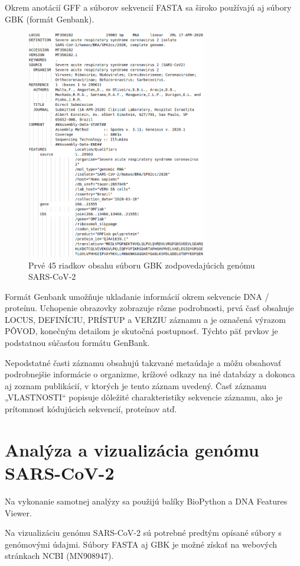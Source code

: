Okrem anotácií GFF a súborov sekvencií FASTA sa široko používajú aj súbory GBK (formát Genbank).
\begin{figure}[!ht]
	\centering
	\includegraphics[width=0.7\textwidth]{figures/gbk.png}
	\caption{Prvé 45 riadkov obsahu súboru GBK zodpovedajúcich genómu SARS-CoV-2\label{o:latex_friendly_zone}}
\end{figure}
Formát Genbank umožňuje ukladanie informácií okrem sekvencie DNA / proteínu.
Uchopenie obrazovky zobrazuje rôzne podrobnosti, prvá časť obsahuje LOCUS, DEFINÍCIU, PRÍSTUP a VERZIU záznamu a je označená výrazom PÔVOD, konečným detailom je skutočná postupnosť.
Týchto päť prvkov je podstatnou súčasťou formátu GenBank.

Nepodstatné časti záznamu obsahujú takzvané metaúdaje a môžu obsahovať podrobnejšie informácie o organizme, krížové odkazy na iné databázy a dokonca aj zoznam publikácií, v ktorých je tento záznam uvedený.
Časť záznamu „VLASTNOSTI“ popisuje dôležité charakteristiky sekvencie záznamu, ako je prítomnosť kódujúcich sekvencií, proteínov atď.

\section{Analýza a vizualizácia genómu SARS-CoV-2}
Na vykonanie samotnej analýzy sa použijú balíky BioPython a DNA Features Viewer.

Na vizualizáciu genómu SARS-CoV-2 sú potrebné predtým opísané súbory s genómovými údajmi. 
Súbory FASTA aj GBK je možné získať na webových stránkach NCBI (MN908947).

